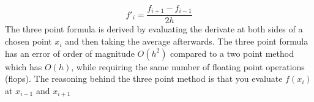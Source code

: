 \begin{equation}\label{eq:3}
  f'_i = \frac{f_{i+1} - f_{i-1}}{2h}
\end{equation}
The three point formula is derived by evaluating the derivate at both sides of a chosen point $x_i$ and then taking the average afterwards. 
The three point formula has an error of order of magnitude $O(h^2)$ compared to a two point method which has $O(h)$, while requiring the same number of floating point operations (flops). The reasoning behind the three point method is that you evaluate $f(x_i)$ at $x_{i-1}$ and $x_{i+1}$ 